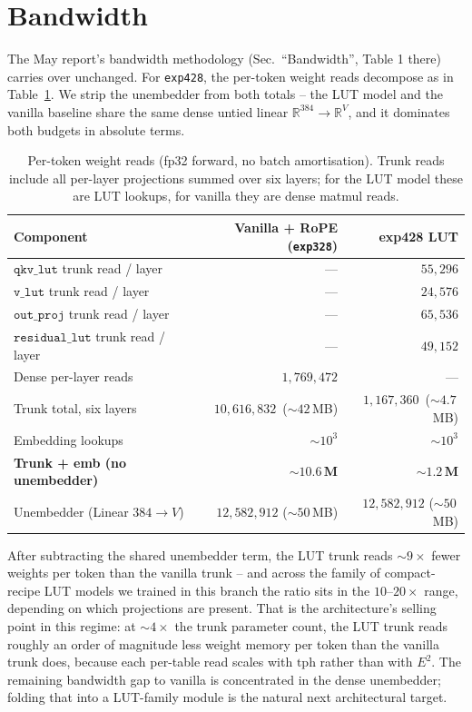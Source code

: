 \documentclass[11pt]{article}
\begin{document}
\section{Bandwidth}
\label{sec:bandwidth}

The May report's bandwidth methodology (Sec.\ ``Bandwidth'', Table 1 there) carries over unchanged.
For \texttt{exp428}, the per-token weight reads decompose as in Table~\ref{tab:bw}.
We strip the unembedder from both totals -- the LUT model and the vanilla baseline share the same dense untied linear $\mathbb{R}^{384} \to \mathbb{R}^{V}$, and it dominates both budgets in absolute terms.

\begin{table}[!ht]
\caption{Per-token weight reads (fp32 forward, no batch amortisation). Trunk reads include all per-layer projections summed over six layers; for the LUT model these are LUT lookups, for vanilla they are dense matmul reads.}
\label{tab:bw}
\centering\small
\begin{tabular}{lrr}
\toprule
Component & Vanilla + RoPE (\texttt{exp328}) & exp428 LUT \\
\midrule
$\mathtt{qkv\_lut}$ trunk read / layer  & --- & $55{,}296$ \\
$\mathtt{v\_lut}$ trunk read / layer    & --- & $24{,}576$ \\
$\mathtt{out\_proj}$ trunk read / layer  & --- & $65{,}536$ \\
$\mathtt{residual\_lut}$ trunk read / layer & --- & $49{,}152$ \\
Dense per-layer reads & $1{,}769{,}472$ & --- \\
\midrule
Trunk total, six layers & $10{,}616{,}832$ \,($\sim$$42$\,MB)  & $1{,}167{,}360$ \,($\sim$$4.7$\,MB) \\
Embedding lookups       & $\sim$$10^3$                         & $\sim$$10^3$ \\
\textbf{Trunk + emb (no unembedder)} & $\sim 10.6\,\mathbf{M}$ & $\sim 1.2\,\mathbf{M}$ \\
Unembedder (Linear $384 \to V$) & $12{,}582{,}912$ ($\sim$$50$\,MB) & $12{,}582{,}912$ ($\sim$$50$\,MB) \\
\bottomrule
\end{tabular}
\end{table}

After subtracting the shared unembedder term, the LUT trunk reads $\sim 9\times$ fewer weights per token than the vanilla trunk -- and across the family of compact-recipe LUT models we trained in this branch the ratio sits in the $10$--$20\times$ range, depending on which projections are present.
That is the architecture's selling point in this regime: at $\sim 4\times$ the trunk parameter count, the LUT trunk reads roughly an order of magnitude less weight memory per token than the vanilla trunk does, because each per-table read scales with $\mathrm{tph}$ rather than with $E^2$.
The remaining bandwidth gap to vanilla is concentrated in the dense unembedder; folding that into a LUT-family module is the natural next architectural target.
\end{document}
